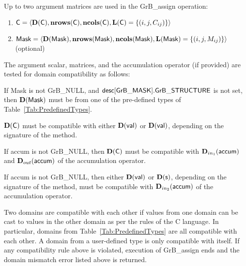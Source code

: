 Up to two argument matrices are used in the {\sf GrB\_assign} operation:
\begin{enumerate}
	\item ${\sf C} = \langle \bold{D}({\sf C}),\bold{nrows}({\sf C}),
    \bold{ncols}({\sf C}),\bold{L}({\sf C}) = \{(i,j,C_{ij}) \} \rangle$

	\item ${\sf Mask} = \langle \bold{D}({\sf Mask}),\bold{nrows}({\sf Mask}),
    \bold{ncols}({\sf Mask}),\bold{L}({\sf Mask}) = \{(i,j,M_{ij}) \} \rangle$ (optional)
\end{enumerate}

The argument scalar, matrices, and the accumulation 
operator (if provided) are tested for domain compatibility as follows:
\begin{enumerate}
	\item If {\sf Mask} is not {\sf GrB\_NULL}, and ${\sf desc[GrB\_MASK].GrB\_STRUCTURE}$
    is not set, then $\bold{D}({\sf Mask})$ must be from one of the pre-defined types of 
    Table~\ref{Tab:PredefinedTypes}.

{\color{red}
	\item $\bold{D}({\sf C})$ must be 
    compatible with either $\bold{D}({\sf val})$ or $\bold{D}({\sf val})$, depending
	on the signature of the method.

	\item If {\sf accum} is not {\sf GrB\_NULL}, then $\bold{D}({\sf C})$ must be
    compatible with $\mbox{$\mathbf{D}_{in_{1}}$}({\sf accum})$ and $\mbox{$\mathbf{D}_{out}$}({\sf accum})$ of the accumulation operator.
	
\item If {\sf accum} is not {\sf GrB\_NULL}, then  
    either $\bold{D}({\sf val})$ or $\bold{D}({\sf s})$, depending on the signature of the method, must be compatible with $\mbox{$\mathbf{D}_{in_{2}}$}({\sf accum})$ of the accumulation operator.
}
\end{enumerate}
Two domains are compatible with each other if values from one domain can be cast 
to values in the other domain as per the rules of the C language.
In particular, domains from Table~\ref{Tab:PredefinedTypes} are all compatible 
with each other. A domain from a user-defined type is only compatible with itself.
If any compatibility rule above is violated, execution of {\sf GrB\_assign} ends
and the domain mismatch error listed above is returned.

